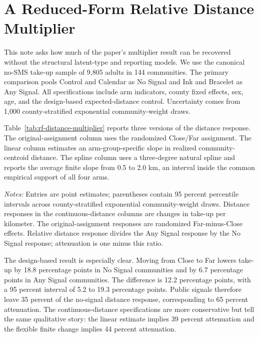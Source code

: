 \documentclass[11pt]{article}
\begin{document}
\section*{A Reduced-Form Relative Distance Multiplier}

This note asks how much of the paper's multiplier result can be recovered
without the structural latent-type and reporting models.  We use the canonical
no-SMS take-up sample of 9,805 adults in 144 communities.  The primary
comparison pools Control and Calendar as No Signal and Ink and Bracelet as Any
Signal.  All specifications include arm indicators, county fixed effects,
sex, age, and the design-based expected-distance control.  Uncertainty comes
from 1,000 county-stratified exponential community-weight draws.

Table~\ref{tab:rf-distance-multiplier} reports three versions of the distance
response.  The original-assignment column uses the randomized Close/Far
assignment.  The linear column estimates an arm-group-specific slope in
realized community-centroid distance.  The spline column uses a three-degree
natural spline and reports the average finite slope from 0.5 to 2.0 km, an
interval inside the common empirical support of all four arms.

\begin{table}[htbp]
  \centering
  \small
  \caption{Reduced-form distance responses and relative attenuation}
  \label{tab:rf-distance-multiplier}
  \resizebox{\linewidth}{!}{}
  \begin{minipage}{0.97\linewidth}
    \vspace{0.4em}\footnotesize
    \textit{Notes:} Entries are point estimates; parentheses contain 95
    percent percentile intervals across county-stratified exponential
    community-weight draws. Distance responses in the continuous-distance
    columns are changes in take-up per kilometer. The original-assignment
    responses are randomized Far-minus-Close effects. Relative distance
    response divides the Any Signal response by the No Signal response;
    attenuation is one minus this ratio.
  \end{minipage}
\end{table}

The design-based result is especially clear.  Moving from Close to Far lowers
take-up by 18.8 percentage points in No Signal communities and by 6.7
percentage points in Any Signal communities.  The difference is 12.2
percentage points, with a 95 percent interval of 5.2 to 19.3 percentage
points.  Public signals therefore leave 35 percent of the no-signal distance
response, corresponding to 65 percent attenuation.  The continuous-distance
specifications are more conservative but tell the same qualitative story:
the linear estimate implies 39 percent attenuation and the flexible finite
change implies 44 percent attenuation.
\end{document}
